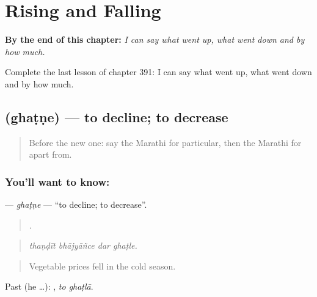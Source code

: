 
\chapter{Rising and Falling}
\label{ch:mr-rising-and-falling}

\begin{chapteropening}
\textbf{By the end of this chapter:} \emph{I can say what went up, what went down and by how much.}

Complete the last lesson of chapter 391: I can say what went up, what went down and by how much.
\end{chapteropening}

\section[\texorpdfstring{\mr{घटणे} (ghaṭṇe)}{घटणे (ghaṭṇe)}]{ (ghaṭṇe) — to decline; to decrease}

\label{lesson:MR-C391-ghatne}



\begin{quote}
Before the new one: say the Marathi for particular, then the Marathi for apart from.
\end{quote}

\subsection*{You'll want to know: }
\textbf{} — \emph{ghaṭṇe} — \textquotedblleft{}to decline; to decrease\textquotedblright{}.

\begin{quote}
   .
\end{quote}

\begin{quote}
\emph{thaṇḍīt bhājyāñce dar ghaṭle.}
\end{quote}

\begin{quote}
Vegetable prices fell in the cold season.
\end{quote}

Past (he …):  , \emph{to ghaṭlā}.

